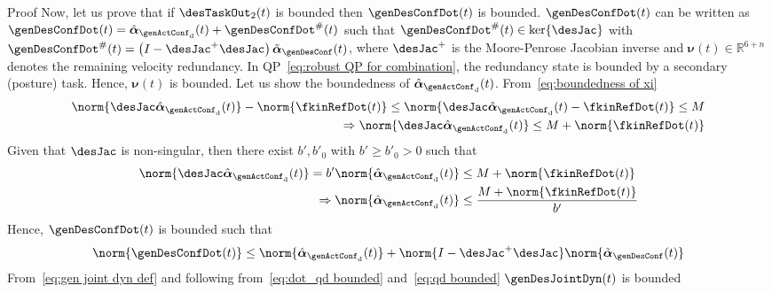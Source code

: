 \begin{custumProof}{Proof}
	Now, let us prove that if $\desTaskOut_2(t)$ is bounded then $\genDesConfDot(t)$ is bounded. 
	$\genDesConfDot(t)$ can be written as $\genDesConfDot(t) = \hat{\boldsymbol{\alpha}}_{{\genActConf}_\mathrm{d}}(t) + \genDesConfDot^{\#}(t)$ such that  $\genDesConfDot^{\#}(t)\in\ker\{\desJac\}$ with $\genDesConfDot^{\#}(t) = \left(I-{\desJac}^{+}\desJac\right)\tilde{\boldsymbol{\alpha}}_{\genDesConf}(t)$, where ${\desJac}^{+}$ is the Moore-Penrose Jacobian inverse and $\boldsymbol{\nu}(t)\in\mathbb{R}^{6+n}$ denotes the remaining velocity redundancy.  In QP~\eqref{eq:robust QP for combination}, the redundancy state is bounded by a secondary (posture) task. Hence, $\boldsymbol{\nu}(t)$ is bounded. 		
	Let us show the boundedness of $\hat{\boldsymbol{\alpha}}_{{\genActConf}_\mathrm{d}}(t)$. From~\cref{eq:boundedness of xi} 
	\begin{align}
		\begin{split}
			\norm{\desJac\hat{\boldsymbol{\alpha}}_{{\genActConf}_\mathrm{d}}(t)} - \norm{\fkinRefDot(t)}\leq\norm{\desJac\hat{\boldsymbol{\alpha}}_{{\genActConf}_\mathrm{d}}(t) - \fkinRefDot(t) }  \leq M \\ 
			\Rightarrow \norm{\desJac\hat{\boldsymbol{\alpha}}_{{\genActConf}_\mathrm{d}}(t)} \leq M + \norm{\fkinRefDot(t)}
		\end{split}
	\end{align}
	Given that $\desJac$ is non-singular, then there exist $b',b'_0$ with $b'\geq b'_0>0$ such that~\cite{golub2013matrixComputations}
	\begin{align}
		\begin{split}
			\norm{\desJac \hat{\boldsymbol{\alpha}}_{{\genActConf}_\mathrm{d}}(t)}  = b' \norm{\hat{\boldsymbol{\alpha}}_{{\genActConf}_\mathrm{d}}(t)}&\leq M+ \norm{\fkinRefDot(t)}\\ \Rightarrow  \norm{\hat{\boldsymbol{\alpha}}_{{\genActConf}_\mathrm{d}}(t)} &\leq \frac{M+ \norm{\fkinRefDot(t)}}{b'}
		\end{split}
	\end{align}
	Hence, $\genDesConfDot(t)$ is bounded such that%
	\begin{equation}\label{eq:dot_qd bounded}
		\norm{\genDesConfDot(t)}\leq\norm{\hat{\boldsymbol{\alpha}}_{{\genActConf}_\mathrm{d}}(t)} + \norm{I-{\desJac}^{+}\desJac}\norm{\tilde{\boldsymbol{\alpha}}_{\genDesConf}(t)}
	\end{equation}
	From~\cref{eq:gen joint dyn def} and following from~\cref{eq:dot_qd bounded} and~\cref{eq:qd bounded} $\genDesJointDyn(t)$ is bounded %

\end{custumProof}
